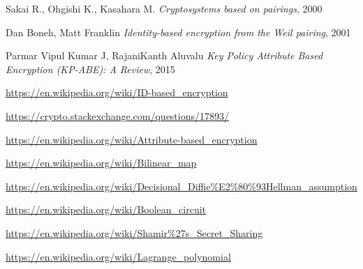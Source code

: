 \documentclass[12pt]{article}
\begin{document}
\begin{thebibliography}{9}
Sakai R., Ohgishi K., Kasahara M.
\textit{Cryptosystems based on pairings}, 2000 

Dan Boneh, Matt Franklin
\textit{Identity-based encryption from the Weil pairing}, 2001

Parmar Vipul Kumar J, RajaniKanth Aluvalu
\textit{Key Policy Attribute Based Encryption (KP-ABE): A Review}, 2015

\href{https://en.wikipedia.org/wiki/ID-based_encryption}{https://en.wikipedia.org/wiki/ID-based\_encryption}

\href{https://crypto.stackexchange.com/questions/17893/what-is-attribute-based-encryption?utm_medium=organic&utm_source=google_rich_qa&utm_campaign=google_rich_qa}{https://crypto.stackexchange.com/questions/17893/}

\href{https://en.wikipedia.org/wiki/Attribute-based_encryption}{https://en.wikipedia.org/wiki/Attribute-based\_encryption}

\href{https://en.wikipedia.org/wiki/Bilinear_map}{https://en.wikipedia.org/wiki/Bilinear\_map}

\href{https://en.wikipedia.org/wiki/Decisional_Diffie\%E2\%80\%93Hellman_assumption}{https://en.wikipedia.org/wiki/Decisional\_Diffie\%E2\%80\%93Hellman\_assumption}

\href{https://en.wikipedia.org/wiki/Boolean_circuit}{https://en.wikipedia.org/wiki/Boolean\_circuit}

\href{https://en.wikipedia.org/wiki/Shamir\%27s_Secret_Sharing}{https://en.wikipedia.org/wiki/Shamir\%27s\_Secret\_Sharing}

\href{https://en.wikipedia.org/wiki/Lagrange_polynomial}{https://en.wikipedia.org/wiki/Lagrange\_polynomial}

\end{thebibliography}

\vspace{\baselineskip}
\end{document}
